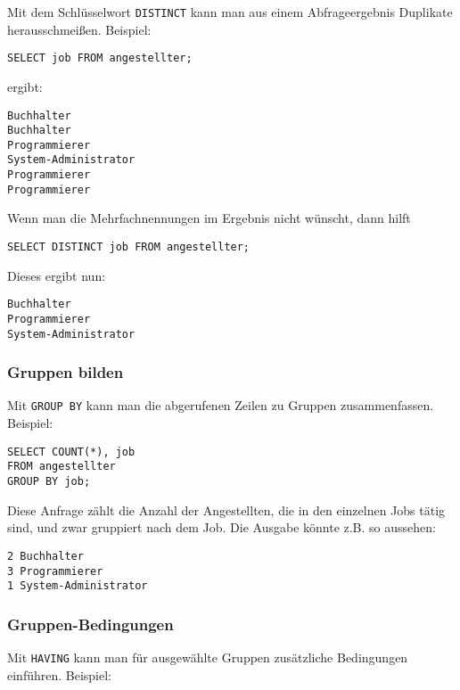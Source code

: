 Mit dem Schlüsselwort \lstinline{DISTINCT} kann man aus einem Abfrageergebnis
Duplikate herausschmeißen. Beispiel:

\begin{lstlisting}
SELECT job FROM angestellter;
\end{lstlisting}

ergibt:

\texttt{Buchhalter\\
Buchhalter\\
Programmierer\\
System-Administrator\\
Programmierer\\
Programmierer
}

Wenn man die Mehrfachnennungen im Ergebnis nicht wünscht, dann hilft

\begin{lstlisting}
SELECT DISTINCT job FROM angestellter;
\end{lstlisting}

Dieses ergibt nun:

\texttt{Buchhalter\\
Programmierer\\
System-Administrator
}


\subsubsection{Gruppen bilden}

Mit \lstinline{GROUP BY} kann man die abgerufenen
Zeilen zu Gruppen zusammenfassen. Beispiel:

\begin{lstlisting}
SELECT COUNT(*), job
FROM angestellter
GROUP BY job;
\end{lstlisting}

Diese Anfrage zählt die Anzahl der
Angestellten, die in den einzelnen Jobs tätig
sind, und zwar gruppiert nach dem Job. Die
Ausgabe könnte z.B. so aussehen:

\texttt{2 Buchhalter\\
3 Programmierer\\
1 System-Administrator
}


\subsubsection{Gruppen-Bedingungen}

Mit \lstinline{HAVING} kann man für ausgewählte Gruppen
zusätzliche Bedingungen einführen. Beispiel:

